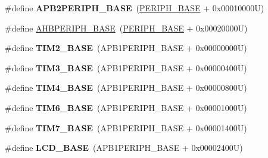 \begin{DoxyCompactItemize}
\item 
\hypertarget{group___peripheral__memory__map_ga25b99d6065f1c8f751e78f43ade652cb}{\#define {\bfseries A\-P\-B2\-P\-E\-R\-I\-P\-H\-\_\-\-B\-A\-S\-E}~(\hyperlink{group___peripheral__memory__map_ga9171f49478fa86d932f89e78e73b88b0}{P\-E\-R\-I\-P\-H\-\_\-\-B\-A\-S\-E} + 0x00010000\-U)}\label{group___peripheral__memory__map_ga25b99d6065f1c8f751e78f43ade652cb}

\item 
\#define \hyperlink{group___peripheral__memory__map_ga92eb5d49730765d2abd0f5b09548f9f5}{A\-H\-B\-P\-E\-R\-I\-P\-H\-\_\-\-B\-A\-S\-E}~(\hyperlink{group___peripheral__memory__map_ga9171f49478fa86d932f89e78e73b88b0}{P\-E\-R\-I\-P\-H\-\_\-\-B\-A\-S\-E} + 0x00020000\-U)
\item 
\hypertarget{group___peripheral__memory__map_ga00d0fe6ad532ab32f0f81cafca8d3aa5}{\#define {\bfseries T\-I\-M2\-\_\-\-B\-A\-S\-E}~(A\-P\-B1\-P\-E\-R\-I\-P\-H\-\_\-\-B\-A\-S\-E + 0x00000000\-U)}\label{group___peripheral__memory__map_ga00d0fe6ad532ab32f0f81cafca8d3aa5}

\item 
\hypertarget{group___peripheral__memory__map_gaf0c34a518f87e1e505cd2332e989564a}{\#define {\bfseries T\-I\-M3\-\_\-\-B\-A\-S\-E}~(A\-P\-B1\-P\-E\-R\-I\-P\-H\-\_\-\-B\-A\-S\-E + 0x00000400\-U)}\label{group___peripheral__memory__map_gaf0c34a518f87e1e505cd2332e989564a}

\item 
\hypertarget{group___peripheral__memory__map_ga56e2d44b0002f316527b8913866a370d}{\#define {\bfseries T\-I\-M4\-\_\-\-B\-A\-S\-E}~(A\-P\-B1\-P\-E\-R\-I\-P\-H\-\_\-\-B\-A\-S\-E + 0x00000800\-U)}\label{group___peripheral__memory__map_ga56e2d44b0002f316527b8913866a370d}

\item 
\hypertarget{group___peripheral__memory__map_ga8268ec947929f192559f28c6bf7d1eac}{\#define {\bfseries T\-I\-M6\-\_\-\-B\-A\-S\-E}~(A\-P\-B1\-P\-E\-R\-I\-P\-H\-\_\-\-B\-A\-S\-E + 0x00001000\-U)}\label{group___peripheral__memory__map_ga8268ec947929f192559f28c6bf7d1eac}

\item 
\hypertarget{group___peripheral__memory__map_ga0ebf54364c6a2be6eb19ded6b18b6387}{\#define {\bfseries T\-I\-M7\-\_\-\-B\-A\-S\-E}~(A\-P\-B1\-P\-E\-R\-I\-P\-H\-\_\-\-B\-A\-S\-E + 0x00001400\-U)}\label{group___peripheral__memory__map_ga0ebf54364c6a2be6eb19ded6b18b6387}

\item 
\hypertarget{group___peripheral__memory__map_ga017749aad23300240ef5ac4c3d5ca750}{\#define {\bfseries L\-C\-D\-\_\-\-B\-A\-S\-E}~(A\-P\-B1\-P\-E\-R\-I\-P\-H\-\_\-\-B\-A\-S\-E + 0x00002400\-U)}\label{group___peripheral__memory__map_ga017749aad23300240ef5ac4c3d5ca750}


\end{DoxyCompactItemize}
